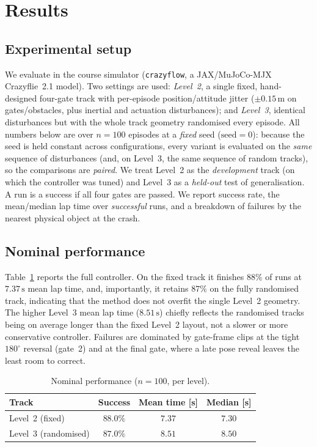 \documentclass[conference]{IEEEtran}
\begin{document}
\section{Results}
\subsection{Experimental setup}
We evaluate in the course simulator (\texttt{crazyflow}, a JAX/MuJoCo-MJX
Crazyflie~2.1 model). Two settings are used: \emph{Level~2}, a single fixed,
hand-designed four-gate track with per-episode position/attitude jitter
($\pm0.15\,\mathrm{m}$ on gates/obstacles, plus inertial and actuation
disturbances); and \emph{Level~3}, identical disturbances but with the whole
track geometry randomised every episode. All numbers below are over $n=100$
episodes at a \emph{fixed} seed ($\mathrm{seed}=0$): because the seed is held
constant across configurations, every variant is evaluated on the \emph{same}
sequence of disturbances (and, on Level~3, the same sequence of random
tracks), so the comparisons are \emph{paired}. We treat Level~2 as the
\emph{development} track (on which the controller was tuned) and Level~3 as a
\emph{held-out} test of generalisation. A run is a success if all four gates are
passed. We report success rate, the mean/median lap time over \emph{successful}
runs, and a breakdown of failures by the nearest physical object at the crash.

\subsection{Nominal performance}
Table~\ref{tab:main} reports the full controller. On the fixed track it finishes
$88\%$ of runs at $7.37\,\mathrm{s}$ mean lap time, and, importantly, it
retains $87\%$ on the fully randomised track, indicating that the method does not
overfit the single Level~2 geometry. The higher Level~3 mean lap time
($8.51\,\mathrm{s}$) chiefly reflects the randomised tracks being on average
longer than the fixed Level~2 layout, not a slower or more conservative
controller. Failures are dominated by gate-frame clips at the tight
$180^\circ$ reversal (gate~2) and at the final gate, where a late pose reveal
leaves the least room to correct.

\begin{table}[t]
\centering
\caption{Nominal performance ($n=100$, per level).}
\label{tab:main}
\begin{tabular}{lccc}
\toprule
Track & Success & Mean time [s] & Median [s]\\
\midrule
Level~2 (fixed) & $88.0\%$ & $7.37$ & $7.30$\\
Level~3 (randomised) & $87.0\%$ & $8.51$ & $8.50$\\
\bottomrule
\end{tabular}
\end{table}
\end{document}
